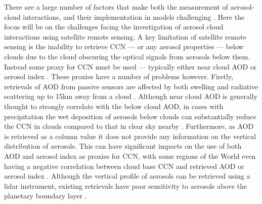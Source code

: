 
There are a large number of factors that make both the measurement of aerosol-cloud interactions, and their implementation in models challenging \citep{mulmenstadt_radiative_2018}.
Here the focus will be on the challenges facing the investigation of aerosol cloud interactions using satellite remote sensing.
A key limitation of satellite remote sensing is the inability to retrieve CCN --- or any aerosol properties --- below clouds due to the cloud obscuring the optical signals from aerosols below them.
Instead some proxy for CCN must be used --- typically either near cloud AOD or aerosol index \citep{deuze_remote_2001}. These proxies have a number of problems however. 
Firstly, retrievals of AOD from passive sensors are affected by both swelling and radiative scattering up to 15km away from a cloud \citep{christensen_unveiling_2017}. 
Although near cloud AOD is generally thought to strongly correlate with the below cloud AOD, in cases with precipitation the wet deposition of aerosols below clouds can substantially reduce the CCN in clouds compared to that in clear sky nearby \citep{gryspeerdt_wet_2015}. 
Furthermore, as AOD is retrieved as a column value it does not provide any information on the vertical distribution of aerosols. 
This can have significant impacts on the use of both AOD and aerosol index as proxies for CCN, with some regions of the World even having a negative correlation between cloud base CCN and retrieved AOD or aerosol index \citep{stier_limitations_2016}. 
Although the vertical profile of aerosols can be retrieved using a lidar instrument, existing retrievals have poor sensitivity to aerosols above the planetary boundary layer \citep{watson-parris_limits_2018}.

